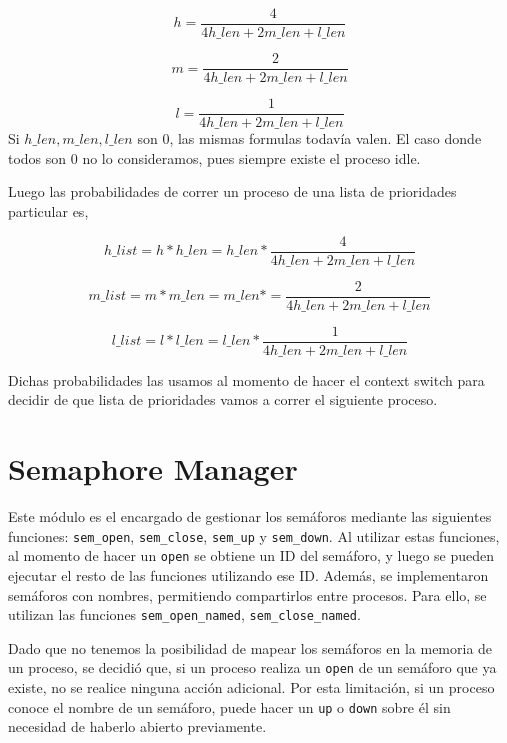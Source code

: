 \documentclass{article}
\begin{document}
\begin{equation*}
h = \frac{4}{4 h\_len + 2 m\_len + l\_len}
\end{equation*}

\begin{equation*}
m = \frac{2}{4 h\_len + 2 m\_len + l\_len}
\end{equation*}

\begin{equation*}
l = \frac{1}{4 h\_len + 2 m\_len + l\_len}
\end{equation*}
Si $h\_len, m\_len, l\_len$ son 0, las mismas formulas todavía valen. El caso donde todos son 0 no lo consideramos, pues siempre existe el proceso idle.

Luego las probabilidades de correr un proceso de una lista de prioridades particular es,

\begin{equation*}
h\_list = h * h\_len = h\_len *  \frac{4}{4 h\_len + 2 m\_len + l\_len}
\end{equation*}

\begin{equation*}
m\_list = m * m\_len = m\_len * = \frac{2}{4 h\_len + 2 m\_len + l\_len}
\end{equation*}

\begin{equation*}
l\_list = l * l\_len = l\_len * \frac{1}{4 h\_len + 2 m\_len + l\_len}
\end{equation*}

Dichas probabilidades las usamos al momento de hacer el context switch para decidir de que lista de prioridades vamos a correr el siguiente proceso.

\section{Semaphore Manager}

Este módulo es el encargado de gestionar los semáforos mediante las siguientes funciones: \texttt{sem\_open}, \texttt{sem\_close}, \texttt{sem\_up} y \texttt{sem\_down}. Al utilizar estas funciones, al momento de hacer un \texttt{open} se obtiene un ID del semáforo, y luego se pueden ejecutar el resto de las funciones utilizando ese ID. Además, se implementaron semáforos con nombres, permitiendo compartirlos entre procesos. Para ello, se utilizan las funciones \texttt{sem\_open\_named}, \texttt{sem\_close\_named}.

Dado que no tenemos la posibilidad de mapear los semáforos en la memoria de un proceso, se decidió que, si un proceso realiza un \texttt{open} de un semáforo que ya existe, no se realice ninguna acción adicional. Por esta limitación, si un proceso conoce el nombre de un semáforo, puede hacer un \texttt{up} o \texttt{down} sobre él sin necesidad de haberlo abierto previamente.
\end{document}
